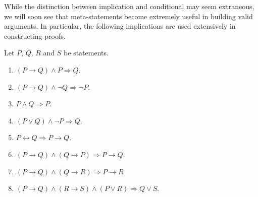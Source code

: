 While the distinction between implication and conditional may seem extraneous, we will soon see that meta-statements become extremely useful in building valid arguments.
In particular, the following implications are used extensively in constructing proofs.
\begin{fact}
Let $P$, $Q$, $R$ and $S$ be statements.
\begin{enumerate}
\item $(P \rightarrow Q) \wedge P \Rightarrow Q$.
\item $(P \rightarrow Q) \wedge \neg Q \Rightarrow \neg P$.
\item $P \wedge Q \Rightarrow P$.
\item $(P \vee Q) \wedge \neg P \Rightarrow Q$.
\item $P \leftrightarrow Q \Rightarrow P \rightarrow Q$.
\item $(P \rightarrow Q) \wedge (Q \rightarrow P) \Rightarrow P \rightarrow Q$.
\item $(P \rightarrow Q) \wedge (Q \rightarrow R) \Rightarrow P \rightarrow R$
\item $(P \rightarrow Q) \wedge (R \rightarrow S) \wedge (P \vee R) \Rightarrow Q \vee S$.
\end{enumerate}
\end{fact}

